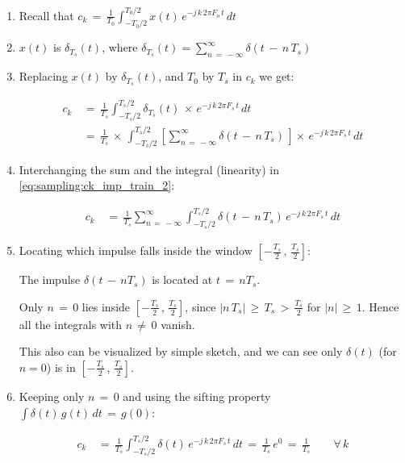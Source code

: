 \begin{enumerate}

\item Recall that $c_k \, = \, \displaystyle\frac{1}{T_0} \int_{-T_0/2}^{T_0/2} x(t) \, e^{-j \, k \, 2 \pi F_o \, t} \, dt $

\item $x(t)$ is $\delta_{T_s}(t)$, where $\delta_{T_s}(t) =  \displaystyle\sum_{n \, = \, -\infty}^{\infty} \delta(t \, - \, n \, T_s)$

\item Replacing $x(t)$ by $\delta_{T_s}(t)$, and $T_0$ by $T_s$ in $c_k$ we get:

\begin{align}
c_k \, &= \, \frac{1}{T_s} \int_{-T_s/2}^{T_s/2} \delta_{T_s}(t) \, \times \, e^{-j \, k \, 2 \pi F_s \, t} \, dt \label{eq:sampling:ck_imp_train_2} \\
&= \, \frac{1}{T_s} \, \times \, \int_{-T_s/2}^{T_s/2} \left[ \sum_{n \, = \, -\infty}^{\infty} \delta(t \, - \, n \, T_s) \, \right] \times \, e^{-j \, k \, 2 \pi F_s \, t} \, dt  \label{eq:sampling:ck_imp_train_2}
\end{align}

\item Interchanging the sum and the integral (linearity) in \autoref{eq:sampling:ck_imp_train_2}:

\begin{align}
c_k \, &= \, \frac{1}{T_s} \sum_{n \, = \, -\infty}^{\infty} \int_{-T_s/2}^{T_s/2} \delta(t \, - \, n \, T_s) \, e^{-j \, k \, 2 \pi F_s \, t} \, dt
\label{Eq:Sampling:ck_swap}
\end{align}

\item Locating which impulse falls inside the window $\left[ -\displaystyle\frac{T_s}{2} \, , \,  \displaystyle\frac{T_s}{2} \right]$:

The impulse $\delta(t \, - \, n T_s)$ is located at $t \, = \, n T_s$.

Only $n \, = \, 0$ lies inside $\left[ -\frac{T_s}{2} \, , \, \frac{T_s}{2} \right]$, since $|n \, T_s| \, \geq \, T_s \, > \, \frac{T_s}{2}$ for $|n| \, \geq \, 1$. Hence all the integrals with $n \, \neq \, 0$ vanish.

This also can be visualized by simple sketch, and we can see only $\delta(t)$	(for $n = 0$) is in $\left[ -\frac{T_s}{2} \, , \, \frac{T_s}{2} \right]$.

\item Keeping only $n \, = \, 0$ and using the sifting property $\int \delta(t) \, g(t) \, dt \, = \, g(0)$:

\begin{align}
c_k \, &= \, \frac{1}{T_s} \int_{-T_s/2}^{T_s/2} \delta(t) \, e^{-j \, k \, 2 \pi F_s \, t} \, dt \, = \, \frac{1}{T_s} \, e^{0} \, = \, \frac{1}{T_s} \qquad \forall \, k
\label{Eq:Sampling:ck_result}
\end{align}

\end{enumerate}


